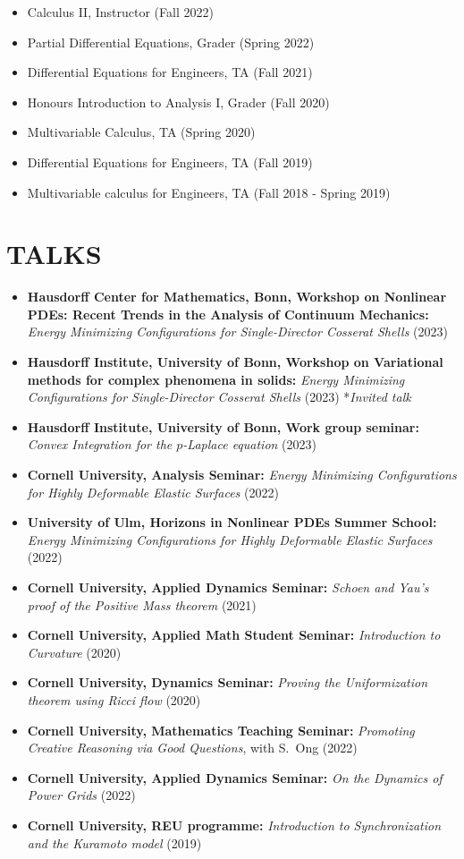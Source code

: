 \documentclass[margin]{res} %
\begin{document}
\begin{resume}
\begin{itemize}
	\item Calculus II, Instructor (Fall 2022)
	\item Partial Differential Equations, Grader (Spring 2022)
	\item Differential Equations for Engineers, TA (Fall 2021)
	\item Honours Introduction to Analysis I, Grader (Fall 2020)
	\item Multivariable Calculus, TA (Spring 2020)
	\item Differential Equations for Engineers, TA (Fall 2019)
	\item Multivariable calculus for Engineers, TA (Fall 2018 - Spring 2019)
\end{itemize}

\section{TALKS}
\begin{itemize}
	\item \textbf{Hausdorff Center for Mathematics, Bonn, Workshop on Nonlinear PDEs: Recent Trends in the Analysis of Continuum Mechanics:} \textit{Energy Minimizing Configurations for Single-Director Cosserat Shells} (2023) 
	\item \textbf{Hausdorff Institute, University of Bonn, Workshop on Variational methods for complex phenomena in solids:} \textit{Energy Minimizing Configurations for Single-Director Cosserat Shells} (2023) *\textit{Invited talk}
	\item \textbf{Hausdorff Institute, University of Bonn, Work group seminar:} \textit{Convex Integration for the $p$-Laplace equation} (2023)
	\item \textbf{Cornell University, Analysis Seminar:} \textit{Energy Minimizing Configurations for Highly Deformable Elastic Surfaces} (2022)
	\item \textbf{University of Ulm, Horizons in Nonlinear PDEs Summer School:} \textit{Energy Minimizing Configurations for Highly Deformable Elastic Surfaces} (2022)
	\item \textbf{Cornell University, Applied Dynamics Seminar:} \textit{Schoen and Yau's proof of the Positive Mass theorem} (2021)
	\item \textbf{Cornell University, Applied Math Student Seminar:} \textit{Introduction to Curvature} (2020)
	\item \textbf{Cornell University, Dynamics Seminar:} \textit{Proving the Uniformization theorem using Ricci flow} (2020)
	\item \textbf{Cornell University, Mathematics Teaching Seminar:} \textit{Promoting Creative Reasoning via Good Questions}, with S.~Ong (2022)
	\item \textbf{Cornell University, Applied Dynamics Seminar:} \textit{On the Dynamics of Power Grids} (2022)
	\item \textbf{Cornell University, REU programme:} \textit{Introduction to Synchronization and the Kuramoto model} (2019)
\end{itemize}


\end{resume}
\end{document}
